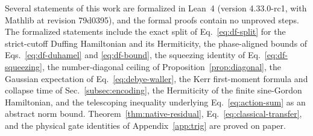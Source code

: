 \documentclass[pra,twocolumn,superscriptaddress,nofootinbib,floatfix]{revtex4-2}
\theoremstyle{remark}
\begin{document}
Several statements of this work are formalized in Lean~4 (version 4.33.0-rc1, with Mathlib at revision 79d0395), and the formal proofs contain no unproved steps. The formalized statements include the exact split of Eq.~\eqref{eq:df-split} for the strict-cutoff Duffing Hamiltonian and its Hermiticity, the phase-aligned bounds of Eqs.~\eqref{eq:df-duhamel} and \eqref{eq:df-bound}, the squeezing identity of Eq.~\eqref{eq:df-squeezing}, the number-diagonal ceiling of Proposition~\ref{prop:diagonal}, the Gaussian expectation of Eq.~\eqref{eq:debye-waller}, the Kerr first-moment formula and collapse time of Sec.~\ref{subsec:encoding}, the Hermiticity of the finite sine-Gordon Hamiltonian, and the telescoping inequality underlying Eq.~\eqref{eq:action-sum} as an abstract norm bound. Theorem~\ref{thm:native-residual}, Eq.~\eqref{eq:classical-transfer}, and the physical gate identities of Appendix~\ref{app:trig} are proved on paper.
\end{document}
